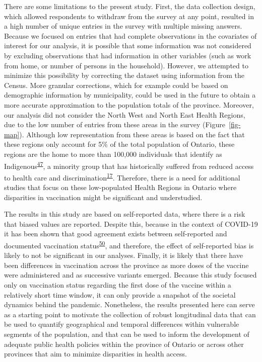 \documentclass[
  letterpaper,
  DIV=11,
  numbers=noendperiod]{scrartcl}
\begin{document}
There are some limitations to the present study. First, the data
collection design, which allowed respondents to withdraw from the survey
at any point, resulted in a high number of unique entries in the survey
with multiple missing answers. Because we focused on entries that had
complete observations in the covariates of interest for our analysis, it
is possible that some information was not considered by excluding
observations that had information in other variables (such as work from
home, or number of persons in the household). However, we attempted to
minimize this possibility by correcting the dataset using information
from the Census. More granular corrections, which for example could be
based on demographic information by municipality, could be used in the
future to obtain a more accurate approximation to the population totals
of the province. Moreover, our analysis did not consider the North West
and North East Health Regions, due to the low number of entries from
these areas in the survey (Figure~\ref{fig-map}). Although low
representation from these areas is based on the fact that these regions
only account for 5\% of the total population of Ontario, these regions
are the home to more than 100,000 individuals that identify as
Indigenous\textsuperscript{\protect\hyperlink{ref-ontariohealth}{47}}, a
minority group that has historically suffered from reduced access to
health care and
discrimination\textsuperscript{\protect\hyperlink{ref-mosby2021}{17}}.
Therefore, there is a need for additional studies that focus on these
low-populated Health Regions in Ontario where disparities in vaccination
might be significant and understudied.

The results in this study are based on self-reported data, where there
is a risk that biased values are reported. Despite this, because in the
context of COVID-19 it has been shown that good agreement exists between
self-reported and documented vaccination
status\textsuperscript{\protect\hyperlink{ref-stephenson2022}{50}}, and
therefore, the effect of self-reported bias is likely to not be
significant in our analyses. Finally, it is likely that there have been
differences in vaccination across the province as more doses of the
vaccine were administered and as successive variants emerged. Because
this study focused only on vaccination status regarding the first dose
of the vaccine within a relatively short time window, it can only
provide a snapshot of the societal dynamics behind the pandemic.
Nonetheless, the results presented here can serve as a starting point to
motivate the collection of robust longitudinal data that can be used to
quantify geographical and temporal differences within vulnerable
segments of the population, and that can be used to inform the
development of adequate public health policies within the province of
Ontario or across other provinces that aim to minimize disparities in
health access.
\end{document}
